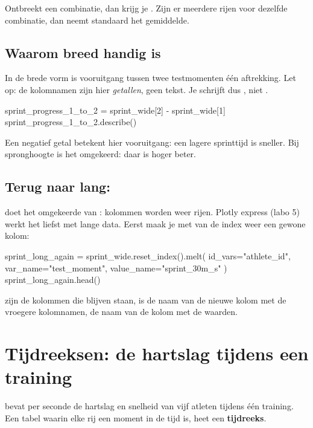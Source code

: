 \documentclass[11pt,a4paper]{article}
\begin{document}
Ontbreekt een combinatie, dan krijg je . Zijn er meerdere rijen
voor dezelfde combinatie, dan neemt  standaard het
gemiddelde.

\subsection{Waarom breed handig is}

In de brede vorm is vooruitgang tussen twee testmomenten één
aftrekking. Let op: de kolomnamen zijn hier \emph{getallen}, geen tekst.
Je schrijft dus , niet .

\begin{python}
sprint_progress_1_to_2 = sprint_wide[2] - sprint_wide[1]
sprint_progress_1_to_2.describe()
\end{python}

Een negatief getal betekent hier vooruitgang: een lagere sprinttijd is
sneller. Bij spronghoogte is het omgekeerd: daar is hoger beter.

\subsection{Terug naar lang: }

 doet het omgekeerde van : kolommen worden
weer rijen. Plotly express (labo 5) werkt het liefst met lange data.
Eerst maak je met  van de index weer een gewone
kolom:

\begin{python}
sprint_long_again = sprint_wide.reset_index().melt(
    id_vars="athlete_id", var_name="test_moment", value_name="sprint_30m_s"
)
sprint_long_again.head()
\end{python}

 zijn de kolommen die blijven staan,  is
de naam van de nieuwe kolom met de vroegere kolomnamen, 
de naam van de kolom met de waarden.

\section{Tijdreeksen: de hartslag tijdens een training}

 bevat per seconde de hartslag en snelheid van vijf
atleten tijdens één training. Een tabel waarin elke rij een moment in de
tijd is, heet een \textbf{tijdreeks}.
\end{document}
